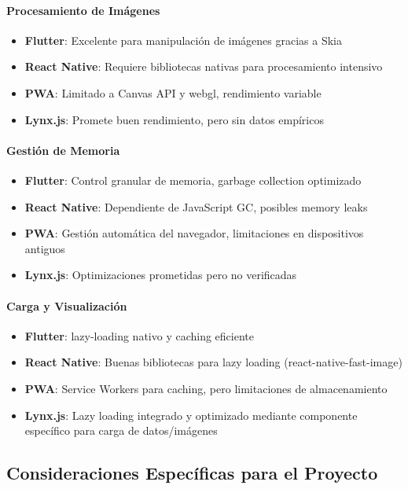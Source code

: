 \paragraph{Procesamiento de Imágenes}
\begin{itemize}
    \item \textbf{Flutter}: Excelente para manipulación de imágenes gracias a Skia
    \item \textbf{React Native}: Requiere bibliotecas nativas para procesamiento intensivo
    \item \textbf{PWA}: Limitado a Canvas API y \gls{webgl}, rendimiento variable
    \item \textbf{Lynx.js}: Promete buen rendimiento, pero sin datos empíricos
\end{itemize}

\paragraph{Gestión de Memoria}
\begin{itemize}
    \item \textbf{Flutter}: Control granular de memoria, garbage collection optimizado
    \item \textbf{React Native}: Dependiente de JavaScript GC, posibles memory leaks
    \item \textbf{PWA}: Gestión automática del navegador, limitaciones en dispositivos antiguos
    \item \textbf{Lynx.js}: Optimizaciones prometidas pero no verificadas
\end{itemize}

\paragraph{Carga y Visualización}
\begin{itemize}
    \item \textbf{Flutter}: \Gls{lazy-loading} nativo y caching eficiente
    \item \textbf{React Native}: Buenas bibliotecas para lazy loading (react-native-fast-image)
    \item \textbf{PWA}: Service Workers para caching, pero limitaciones de almacenamiento
    \item \textbf{Lynx.js}: Lazy loading integrado y optimizado mediante componente específico para carga de datos/imágenes
\end{itemize}

\subsection{Consideraciones Específicas para el Proyecto}

